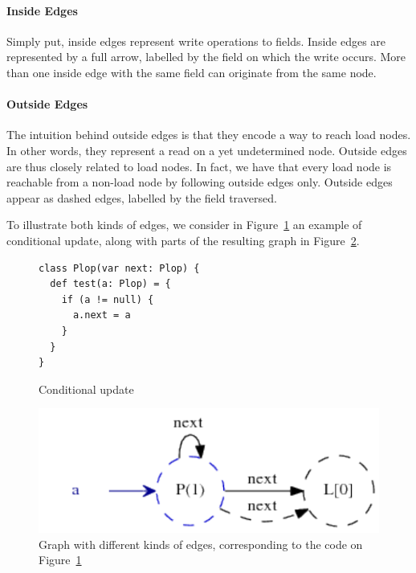 \paragraph{Inside Edges} Simply put, inside edges represent write operations to
fields. Inside edges are represented by a full arrow, labelled by the field on
which the write occurs. More than one inside edge with the same field can
originate from the same node.

\paragraph{Outside Edges} The intuition behind outside edges is that they
encode a way to reach load nodes. In other words, they represent a read on a
yet undetermined node. Outside edges are thus closely related to load nodes. In
fact, we have that every load node is reachable from a non-load node by
following outside edges only. Outside edges appear as dashed edges, labelled by
the field traversed.

To illustrate both kinds of edges, we consider in Figure~\ref{fig:pt:weak1} an
example of conditional update, along with parts of the resulting graph in
Figure~\ref{fig:pt:weak1graph}.

\begin{figure}[h]
    \centering
\begin{lstlisting}
class Plop(var next: Plop) {
  def test(a: Plop) = {
    if (a != null) {
      a.next = a
    }
  }
}
\end{lstlisting}
    \caption{Conditional update}
    \label{fig:pt:weak1}
\end{figure}

\begin{figure}[h]
    \centering

    \includegraphics{images/pt_weak1graph}

    \caption{Graph with different kinds of edges, corresponding to the code on
Figure~\ref{fig:pt:weak1}}
    \label{fig:pt:weak1graph}
\end{figure}

